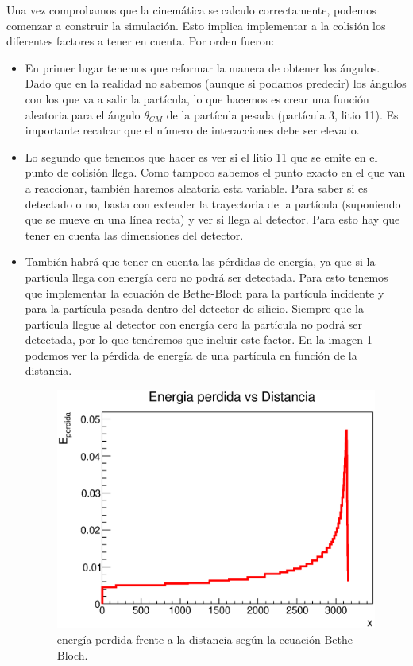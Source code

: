 \documentclass[12pt,a4paper]{article}
\numberwithin{equation}{section}
\numberwithin{figure}{section}
\begin{document}
Una vez comprobamos que la cinemática se calculo correctamente, podemos comenzar a construir la simulación. Esto implica implementar a la colisión los diferentes factores a tener en cuenta. Por orden fueron:

\begin{itemize}
    \item En primer lugar tenemos que reformar la manera de obtener los ángulos. Dado que en la realidad no sabemos (aunque si podamos predecir) los ángulos con los que va a salir la partícula, lo que hacemos es crear una función aleatoria para el ángulo $\theta_{CM}$ de la partícula pesada (partícula 3, litio 11). Es importante recalcar que el número de interacciones debe ser elevado. 
    

    \item Lo segundo que tenemos que hacer es ver si el litio 11 que se emite en el punto de colisión llega. Como tampoco sabemos el punto exacto en el que van a reaccionar, también haremos aleatoria esta variable. Para saber si es detectado o no, basta con extender la trayectoria de la partícula (suponiendo que se mueve en una línea recta) y ver si llega al detector. Para esto hay que tener en cuenta las dimensiones del detector. 
    

    \item También habrá que tener en cuenta las pérdidas de energía, ya que si la partícula llega con energía cero no podrá ser detectada. Para esto tenemos que implementar la ecuación de Bethe-Bloch para la partícula incidente y para la partícula pesada dentro del detector de silicio. Siempre que la partícula llegue al detector con energía cero la partícula no podrá ser detectada, por lo que tendremos que incluir este factor. En la imagen \ref{Fig:energia_perdida} podemos ver la pérdida de energía de una partícula en función de la distancia.
    
    \begin{figure}[h!] \centering
        \includegraphics[scale=0.7]{srim.eps}
        \caption{energía perdida frente a la distancia según la ecuación Bethe-Bloch.}
        \label{Fig:energia_perdida}
    \end{figure}

\end{itemize}
\end{document}
